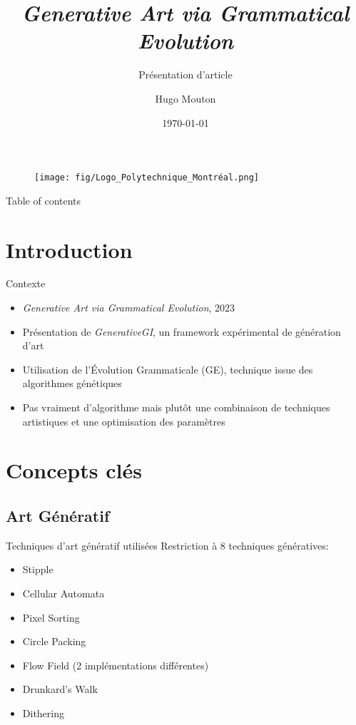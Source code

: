 \documentclass[aspectratio=169]{beamer}
\author{Hugo Mouton}
\title{\textit{Generative Art via Grammatical Evolution}}
\subtitle{Présentation d'article}
\institute{
    Polytechnique Montréal
}
\date{\today}
\begin{document}
\begin{frame}
    \titlepage
    \begin{figure}[htpb]
        \begin{center}
            \vspace{-0.5cm}\texttt{[image: fig/Logo\_Polytechnique\_Montréal.png]}
        \end{center}
    \end{figure}
\end{frame}

\begin{frame}{Table of contents}
    \tableofcontents[sectionstyle=show,subsectionstyle=hide]
\end{frame}

\section{Introduction}

\begin{frame}{Contexte}
    \begin{itemize}
        \item \textit{Generative Art via Grammatical Evolution}, 2023 
        \item Présentation de \textit{GenerativeGI}, un framework expérimental de génération d'art
        \item Utilisation de l'Évolution Grammaticale (GE), technique issue des algorithmes génétiques
        \item Pas vraiment d'algorithme mais plutôt une combinaison de techniques artistiques et une optimisation des paramètres
    \end{itemize}
\end{frame}

\section{Concepts clés}

\subsection{Art Génératif}

\begin{frame}{Techniques d'art génératif utilisées}
    Restriction à 8 techniques génératives: 
    \begin{multicols}{2}
        \begin{itemize}
            \item Stipple
            \item Cellular Automata
            \item Pixel Sorting 
            \item Circle Packing 
            \item Flow Field (2 implémentations différentes)
            \item Drunkard's Walk 
            \item Dithering 
        \end{itemize}
    \end{multicols}
\end{frame}
\end{document}
